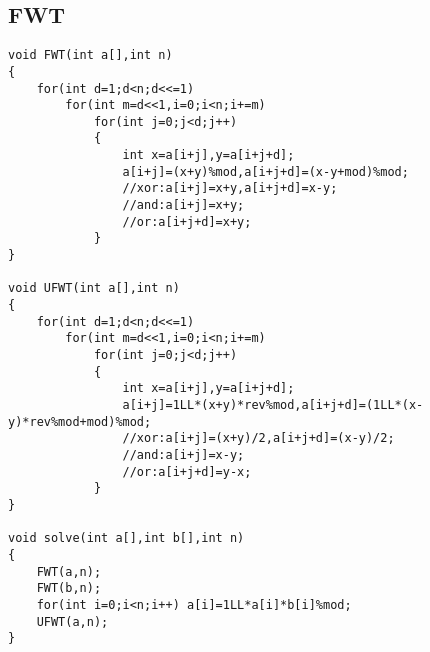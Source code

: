 \documentclass{article}
\begin{document}
\subsection{FWT}
\begin{lstlisting}
void FWT(int a[],int n)
{
    for(int d=1;d<n;d<<=1)
        for(int m=d<<1,i=0;i<n;i+=m)
            for(int j=0;j<d;j++)
            {
                int x=a[i+j],y=a[i+j+d];
                a[i+j]=(x+y)%mod,a[i+j+d]=(x-y+mod)%mod;
                //xor:a[i+j]=x+y,a[i+j+d]=x-y;
                //and:a[i+j]=x+y;
                //or:a[i+j+d]=x+y;
            }
}
 
void UFWT(int a[],int n)
{
    for(int d=1;d<n;d<<=1)
        for(int m=d<<1,i=0;i<n;i+=m)
            for(int j=0;j<d;j++)
            {
                int x=a[i+j],y=a[i+j+d];
                a[i+j]=1LL*(x+y)*rev%mod,a[i+j+d]=(1LL*(x-y)*rev%mod+mod)%mod;
                //xor:a[i+j]=(x+y)/2,a[i+j+d]=(x-y)/2;
                //and:a[i+j]=x-y;
                //or:a[i+j+d]=y-x;
            }
}

void solve(int a[],int b[],int n)
{
    FWT(a,n);
    FWT(b,n);
    for(int i=0;i<n;i++) a[i]=1LL*a[i]*b[i]%mod;
    UFWT(a,n);
}
\end{lstlisting}
\end{document}

